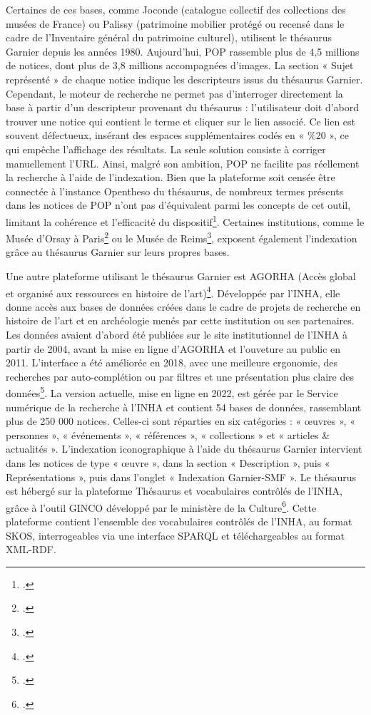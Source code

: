 Certaines de ces bases, comme Joconde (catalogue collectif des collections des musées de France) ou Palissy (patrimoine mobilier protégé ou recensé dans le cadre de l’Inventaire général du patrimoine culturel), utilisent le thésaurus Garnier depuis les années 1980. Aujourd’hui, POP rassemble plus de 4,5 millions de notices, dont plus de 3,8 millions accompagnées d’images. La section « Sujet représenté » de chaque notice indique les descripteurs issus du thésaurus Garnier. Cependant, le moteur de recherche ne permet pas d’interroger directement la base à partir d’un descripteur provenant du thésaurus : l’utilisateur doit d’abord trouver une notice qui contient le terme et cliquer sur le lien associé. Ce lien est souvent défectueux, insérant des espaces supplémentaires codés en « \%20 », ce qui empêche l’affichage des résultats. La seule solution consiste à corriger manuellement l’URL. Ainsi, malgré son ambition, POP ne facilite pas réellement la recherche à l’aide de l’indexation. Bien que la plateforme soit censée être connectée à l’instance Opentheso du thésaurus, de nombreux termes présents dans les notices de POP n’ont pas d’équivalent parmi les concepts de cet outil, limitant la cohérence et l’efficacité du dispositif\footcite{ministeredelacultureThesaurusIconographiqueGarnier}. Certaines institutions, comme le Musée d’Orsay à Paris\footcite{museedorsayCollections} ou le Musée de Reims\footcite{museedereimsOeuvresLigne}, exposent également l’indexation grâce au thésaurus Garnier sur leurs propres bases.

Une autre plateforme utilisant le thésaurus Garnier est AGORHA (Accès global et organisé aux ressources en histoire de l’art)\footcite{institutnationaldhistoiredelartAGORHA}. Développée par l’INHA, elle donne accès aux bases de données créées dans le cadre de projets de recherche en histoire de l’art et en archéologie menés par cette institution ou ses partenaires. Les données avaient d’abord été publiées sur le site institutionnel de l’INHA à partir de 2004, avant la mise en ligne d’AGORHA et l’ouveture au public en 2011. L’interface a été améliorée en 2018, avec une meilleure ergonomie, des recherches par auto-complétion ou par filtres et une présentation plus claire des données\footcite{labordeBasesDonneesLINHA2021}. La version actuelle, mise en ligne en 2022, est gérée par le Service numérique de la recherche à l’INHA et contient 54 bases de données, rassemblant plus de 250 000 notices. Celles-ci sont réparties en six catégories : « œuvres », « personnes », « événements », « références », « collections » et « articles \& actualités ». L’indexation iconographique à l’aide du thésaurus Garnier intervient dans les notices de type « œuvre », dans la section « Description », puis « Représentations », puis dans l’onglet « Indexation Garnier-SMF ». Le thésaurus est hébergé sur la plateforme Thésaurus et vocabulaires contrôlés de l’INHA, grâce à l’outil GINCO développé par le ministère de la Culture\footcite{institutnationaldhistoiredelartThesaurusVocabulairesControles}. Cette plateforme contient l’ensemble des vocabulaires contrôlés de l’INHA, au format SKOS, interrogeables via une interface SPARQL et téléchargeables au format XML-RDF.


